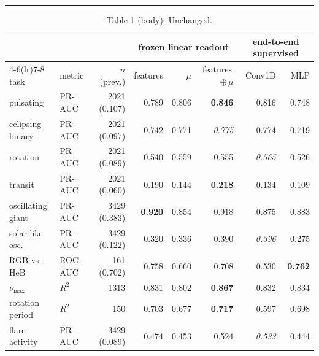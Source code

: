 \documentclass{article}
\begin{document}
\noindent\rule{\linewidth}{0.4pt}\par{}
\begin{table}[h]\caption{Table 1 (body). Unchanged.}
\centering\scriptsize
\begin{tabular}{llrrrrrr}
\toprule
 & & & \multicolumn{3}{c}{frozen linear readout} & \multicolumn{2}{c}{end-to-end supervised} \\
\cmidrule(lr){4-6}\cmidrule(lr){7-8}
task & metric & $n$ (prev.) & features & $\mu$ & features\,$\oplus$\,$\mu$ & Conv1D & MLP \\
\midrule
pulsating & PR-AUC & 2021 (0.107) & 0.789 & 0.806 & \textbf{0.846} & 0.816 & 0.748 \\
eclipsing binary & PR-AUC & 2021 (0.097) & 0.742 & 0.771 & \textit{0.775} & 0.774 & 0.719 \\
rotation & PR-AUC & 2021 (0.089) & 0.540 & 0.559 & 0.555 & \textit{0.565} & 0.526 \\
transit & PR-AUC & 2021 (0.060) & 0.190 & 0.144 & \textbf{0.218} & 0.134 & 0.109 \\
oscillating giant & PR-AUC & 3429 (0.383) & \textbf{0.920} & 0.854 & 0.918 & 0.875 & 0.883 \\
solar-like osc. & PR-AUC & 3429 (0.122) & 0.320 & 0.336 & 0.390 & \textit{0.396} & 0.275 \\
RGB vs. HeB & ROC-AUC & 161 (0.702) & 0.758 & 0.660 & 0.708 & 0.530 & \textbf{0.762} \\
$\nu_{\max}$ & $R^2$ & 1313 & 0.831 & 0.802 & \textbf{0.867} & 0.832 & 0.834 \\
rotation period & $R^2$ & 150 & 0.703 & 0.677 & \textbf{0.717} & 0.597 & 0.698 \\
flare activity & PR-AUC & 3429 (0.089) & 0.474 & 0.453 & 0.524 & \textit{0.533} & 0.444 \\
\bottomrule
\end{tabular}
\end{table}
\end{document}
